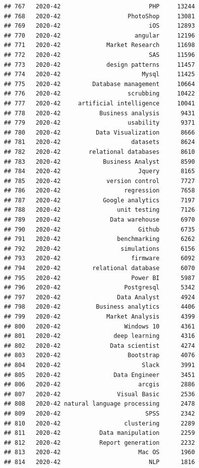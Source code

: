 \documentclass[
]{article}
\begin{document}
\begin{verbatim}
## 767   2020-42                         PHP     13244
## 768   2020-42                   PhotoShop     13081
## 769   2020-42                         iOS     12893
## 770   2020-42                     angular     12196
## 771   2020-42             Market Research     11698
## 772   2020-42                         SAS     11596
## 773   2020-42             design patterns     11457
## 774   2020-42                       Mysql     11425
## 775   2020-42         Database management     10664
## 776   2020-42                   scrubbing     10422
## 777   2020-42     artificial intelligence     10041
## 778   2020-42           Business analysis      9431
## 779   2020-42                   usability      9371
## 780   2020-42          Data Visualization      8666
## 781   2020-42                    datasets      8624
## 782   2020-42        relational databases      8610
## 783   2020-42            Business Analyst      8590
## 784   2020-42                      Jquery      8165
## 785   2020-42             version control      7727
## 786   2020-42                  regression      7658
## 787   2020-42            Google analytics      7197
## 788   2020-42                unit testing      7126
## 789   2020-42              Data warehouse      6970
## 790   2020-42                      Github      6735
## 791   2020-42                benchmarking      6262
## 792   2020-42                 simulations      6156
## 793   2020-42                    firmware      6092
## 794   2020-42         relational database      6070
## 795   2020-42                    Power BI      5987
## 796   2020-42                  Postgresql      5342
## 797   2020-42                Data Analyst      4924
## 798   2020-42          Business analytics      4406
## 799   2020-42             Market Analysis      4399
## 800   2020-42                  Windows 10      4361
## 801   2020-42               deep learning      4316
## 802   2020-42              Data scientist      4274
## 803   2020-42                   Bootstrap      4076
## 804   2020-42                       Slack      3991
## 805   2020-42               Data Engineer      3451
## 806   2020-42                      arcgis      2886
## 807   2020-42                Visual Basic      2536
## 808   2020-42 natural language processing      2478
## 809   2020-42                        SPSS      2342
## 810   2020-42                  clustering      2289
## 811   2020-42           Data manipulation      2259
## 812   2020-42           Report generation      2232
## 813   2020-42                      Mac OS      1960
## 814   2020-42                         NLP      1816

\end{verbatim}
\end{document}
